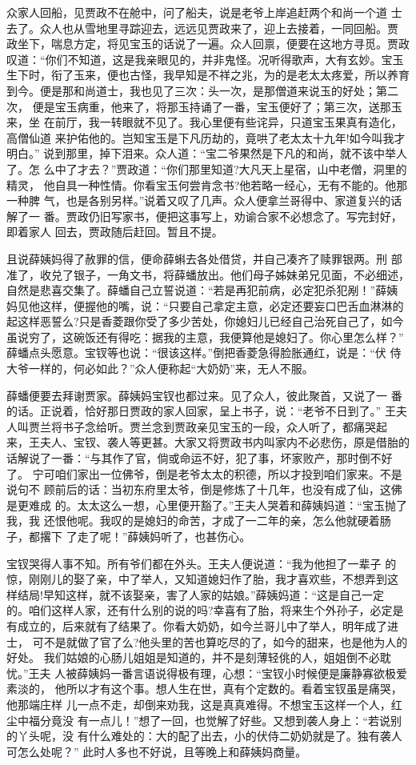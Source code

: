 众家人回船，见贾政不在舱中，问了船夫，说是老爷上岸追赶两个和尚一个道
士去了。众人也从雪地里寻踪迎去，远远见贾政来了，迎上去接着，一同回船。贾
政坐下，喘息方定，将见宝玉的话说了一遍。众人回禀，便要在这地方寻觅。贾政
叹道：“你们不知道，这是我亲眼见的，并非鬼怪。况听得歌声，大有玄妙。宝玉
生下时，衔了玉来，便也古怪，我早知是不祥之兆，为的是老太太疼爱，所以养育
到今。便是那和尚道士，我也见了三次：头一次，是那僧道来说玉的好处；第二次，
便是宝玉病重，他来了，将那玉持诵了一番，宝玉便好了；第三次，送那玉来，坐
在前厅，我一转眼就不见了。我心里便有些诧异，只道宝玉果真有造化，高僧仙道
来护佑他的。岂知宝玉是下凡历劫的，竟哄了老太太十九年!如今叫我才明白。”
说到那里，掉下泪来。众人道：“宝二爷果然是下凡的和尚，就不该中举人了。怎
么中了才去？”贾政道：“你们那里知道?大凡天上星宿，山中老僧，洞里的精灵，
他自具一种性情。你看宝玉何尝肯念书?他若略一经心，无有不能的。他那一种脾
气，也是各别另样。”说着又叹了几声。众人便拿兰哥得中、家道复兴的话解了一
番。贾政仍旧写家书，便把这事写上，劝谕合家不必想念了。写完封好，即着家人
回去，贾政随后赶回。暂且不提。

且说薛姨妈得了赦罪的信，便命薛蝌去各处借贷，并自己凑齐了赎罪银两。刑
部准了，收兑了银子，一角文书，将薛蟠放出。他们母子姊妹弟兄见面，不必细述，
自然是悲喜交集了。薛蟠自己立誓说道：“若是再犯前病，必定犯杀犯剐！”薛姨
妈见他这样，便握他的嘴，说：“只要自己拿定主意，必定还要妄口巴舌血淋淋的
起这样恶誓么?只是香菱跟你受了多少苦处，你媳妇儿已经自己治死自己了，如今
虽说穷了，这碗饭还有得吃：据我的主意，我便算他是媳妇了。你心里怎么样？”
薛蟠点头愿意。宝钗等也说：“很该这样。”倒把香菱急得脸胀通红，说是：“伏
侍大爷一样的，何必如此？”众人便称起“大奶奶”来，无人不服。

薛蟠便要去拜谢贾家。薛姨妈宝钗也都过来。见了众人，彼此聚首，又说了一
番的话。正说着，恰好那日贾政的家人回家，呈上书子，说：“老爷不日到了。”
王夫人叫贾兰将书子念给听。贾兰念到贾政亲见宝玉的一段，众人听了，都痛哭起
来，王夫人、宝钗、袭人等更甚。大家又将贾政书内叫家内不必悲伤，原是借胎的
话解说了一番：“与其作了官，倘或命运不好，犯了事，坏家败产，那时倒不好了。
宁可咱们家出一位佛爷，倒是老爷太太的积德，所以才投到咱们家来。不是说句不
顾前后的话：当初东府里太爷，倒是修炼了十几年，也没有成了仙，这佛是更难成
的。太太这么一想，心里便开豁了。”王夫人哭着和薛姨妈道：“宝玉抛了我，我
还恨他呢。我叹的是媳妇的命苦，才成了一二年的亲，怎么他就硬着肠子，都撂下
了走了呢！”薛姨妈听了，也甚伤心。

宝钗哭得人事不知。所有爷们都在外头。王夫人便说道：“我为他担了一辈子
的惊，刚刚儿的娶了亲，中了举人，又知道媳妇作了胎，我才喜欢些，不想弄到这
样结局!早知这样，就不该娶亲，害了人家的姑娘。”薛姨妈道：“这是自己一定
的。咱们这样人家，还有什么别的说的吗?幸喜有了胎，将来生个外孙子，必定是
有成立的，后来就有了结果了。你看大奶奶，如今兰哥儿中了举人，明年成了进士，
可不是就做了官了么?他头里的苦也算吃尽的了，如今的甜来，也是他为人的好处。
我们姑娘的心肠儿姐姐是知道的，并不是刻薄轻佻的人，姐姐倒不必耽忧。”王夫
人被薛姨妈一番言语说得极有理，心想：“宝钗小时候便是廉静寡欲极爱素淡的，
他所以才有这个事。想人生在世，真有个定数的。看着宝钗虽是痛哭，他那端庄样
儿一点不走，却倒来劝我，这是真真难得。不想宝玉这样一个人，红尘中福分竟没
有一点儿！”想了一回，也觉解了好些。又想到袭人身上：“若说别的丫头呢，没
有什么难处的：大的配了出去，小的伏侍二奶奶就是了。独有袭人可怎么处呢？”
此时人多也不好说，且等晚上和薛姨妈商量。

